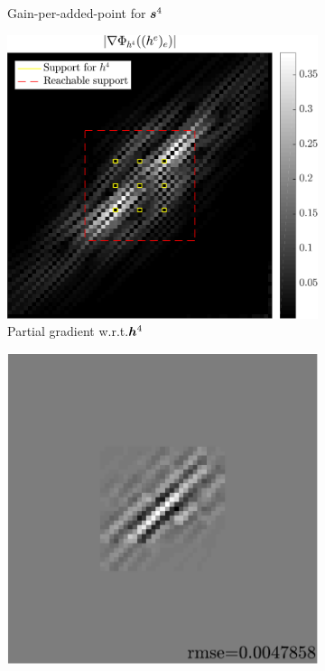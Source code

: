 \begin{figure}[!ht]
\begin{subfigure}[b]{0.34\linewidth}
	\caption{Gain-per-added-point for $\bm{s}^4$}\label{fig_gain_n4-gain}
	\end{subfigure}
	\begin{subfigure}[b]{0.34\linewidth}\centering
	\includegraphics[width=\linewidth]{figures/xp/n4/xp_128x128_sc2_angl1_K3_S3_node4_partgrad4.pdf}
	\caption{Partial gradient w.r.t.\@ $\bm{h}^4$}\label{fig_gain_n4-grad}
	\end{subfigure}
	\begin{subfigure}[b]{0.30\linewidth}\centering
	\includegraphics[width=\linewidth]{figures/xp/n4/xp_128x128_sc2_angl1_K3_S3_node4_approx.pdf}

\end{subfigure}
\end{figure}
